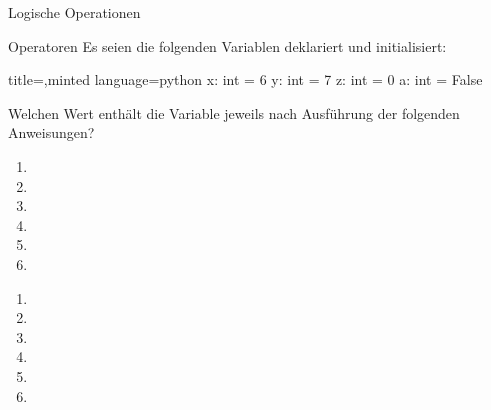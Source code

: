 \begin{task}[points=auto]{Logische Operationen }
    \begin{subtask*}[points=0]{Operatoren}
        Es seien die folgenden Variablen deklariert und initialisiert:
        \begin{codeBlock}[]{title=,minted language=python}
            x: int = 6
            y: int = 7
            z: int = 0
            a: int = False
        \end{codeBlock}
        Welchen Wert enthält die Variable  jeweils nach Ausführung der folgenden Anweisungen?
        \begin{enumerate}
            \item {}
            \item {}
            \item {}
            \item {}
            \item {}
            \item {}
        \end{enumerate}

        \begin{solution}
            \begin{multicols}{3}
                \begin{enumerate}
                    \item {}
                    \item {}
                    \item {}
                    \item {}
                    \item {}
                    \item {}
                \end{enumerate}
            \end{multicols}
        \end{solution}
    \end{subtask*}
\end{task}
